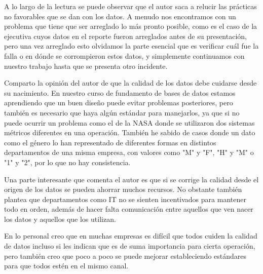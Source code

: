 \documentclass{exam}
\begin{document}
A lo largo de la lectura se puede observar que el autor saca a relucir las prácticas no favorables que se dan con los datos. A menudo nos encontramos con un problema que tiene que ser arreglado lo más pronto posible, como es el caso de la ejecutiva cuyos datos en el reporte fueron arreglados antes de su presentación, pero una vez arreglado esto olvidamos la parte esencial que es verificar cuál fue la falla o en dónde se corrompieron estos datos, y simplemente continuamos con nuestro trabajo hasta que se presenta otro incidente.

Comparto la opinión del autor de que la calidad de los datos debe cuidarse desde su nacimiento. En nuestro curso de fundamento de bases de datos estamos aprendiendo que un buen diseño puede evitar problemas posteriores, pero también es necesario que haya algún estándar para manejarlos, ya que si no puede ocurrir un problema como el de la NASA donde se utilizaron dos sistemas métricos diferentes en una operación. También he sabido de casos donde un dato como el género lo han representado de diferentes formas en distintos departamentos de una misma empresa, con valores como "M" y "F", "H" y "M" o "1" y "2", por lo que no hay consistencia.

Una parte interesante que comenta el autor es que si se corrige la calidad desde el origen de los datos se pueden ahorrar muchos recursos. No obstante también plantea que departamentos como IT no se sienten incentivados para mantener todo en orden, además de hacer falta comunicación entre aquellos que ven nacer los datos y aquellos que los utilizan.

En lo personal creo que en muchas empresas es difícil que todos cuiden la calidad de datos incluso si les indican que es de suma importancia para cierta operación, pero también creo que poco a poco se puede mejorar estableciendo estándares para que todos estén en el mismo canal.

\pagebreak
\end{document}
